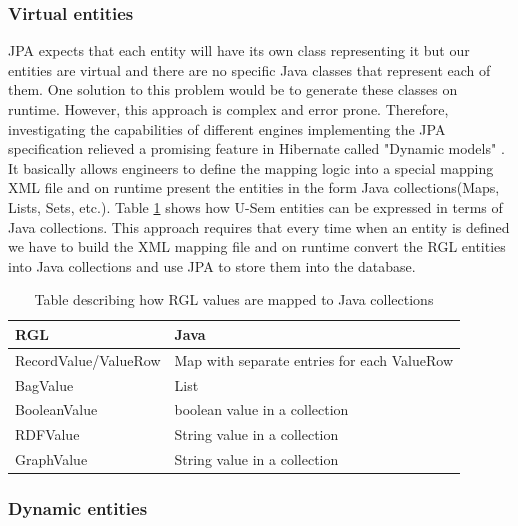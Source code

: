 \subsubsection{Virtual entities}

JPA expects that each entity will have its own class representing it but our entities are virtual and there are no specific Java classes that represent each of them. One solution to this problem would be to generate these classes on runtime. However, this approach is complex and error prone. Therefore, investigating the capabilities of different engines implementing the JPA specification relieved a promising feature in Hibernate called "Dynamic models" \cite{King10}. It basically allows engineers to define the mapping logic into a special mapping XML file and on runtime present the entities in the form Java collections(Maps, Lists, Sets, etc.). Table \ref{tbl:rgl2java} shows how U-Sem entities can be expressed in terms of Java collections. This approach requires that every time when an entity is defined we have to build the XML mapping file and on runtime convert the RGL entities into Java collections and use JPA to store them into the database.

\begin{table}[h]
    \begin{tabular}{ | l | l |}
    \hline
    RGL & Java  \\ \hline
    RecordValue/ValueRow & Map with separate entries for each ValueRow \\ \hline
    BagValue & List  \\ \hline
    BooleanValue & boolean value in a collection  \\ \hline
    RDFValue & String value in a collection  \\ \hline
	GraphValue & String  value in a collection  \\ \hline

    \end{tabular}
     \caption{Table describing how RGL values are mapped to Java collections}
    \label{tbl:rgl2java}
\end{table}
 
\subsubsection{Dynamic entities}

